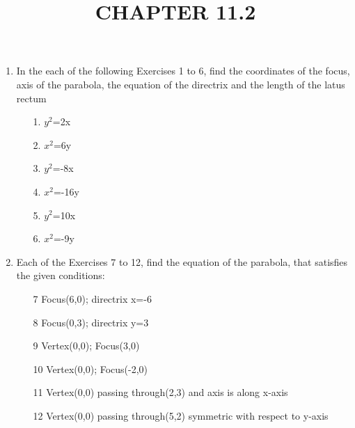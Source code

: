 \documentclass[12pt]{article}
\begin{document}
\title{\textbf{CHAPTER 11.2}}
\maketitle
\begin{enumerate}
\item In the each of the following Exercises 1 to 6, find the coordinates of the focus, axis of the parabola, the equation of the directrix and the length of the latus rectum

\begin{enumerate}  
\item[1.] $y^2$=2x  
\item[2.] $x^2$=6y  
\item[3.] $y^2$=-8x
\item[4.] $x^2$=-16y
\item[5.] $y^2$=10x 
\item[6.] $x^2$=-9y
\end{enumerate}



 \item Each of the Exercises 7 to 12, find the equation of the parabola, that satisfies the given conditions: 

\begin{enumerate}
\item[7] Focus(6,0); directrix x=-6 \item[8] Focus(0,3); directrix y=3 \item[9] Vertex(0,0); Focus(3,0)  \item[10] Vertex(0,0); Focus(-2,0)  \item[11] Vertex(0,0) passing through(2,3) and axis is along x-axis \item[12] Vertex(0,0) passing through(5,2) symmetric with respect to y-axis

\end{enumerate}
\end{enumerate}
\end{document}
